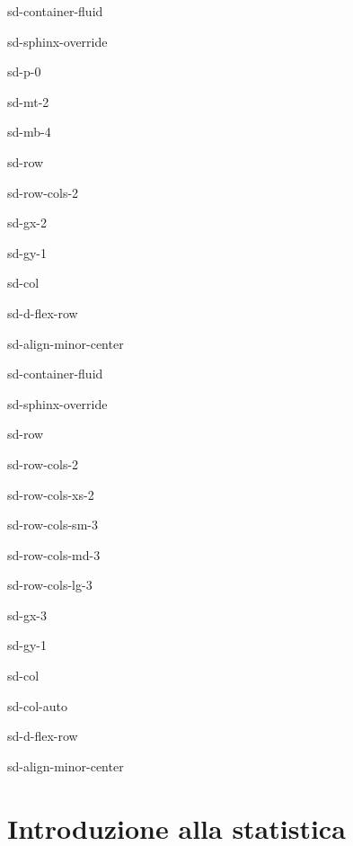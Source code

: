 \documentclass[letterpaper,10pt,italian]{jupyterBook}
\begin{document}
\begin{sphinxuseclass}{sd-container-fluid}
\begin{sphinxuseclass}{sd-sphinx-override}
\begin{sphinxuseclass}{sd-p-0}
\begin{sphinxuseclass}{sd-mt-2}
\begin{sphinxuseclass}{sd-mb-4}
\begin{sphinxuseclass}{sd-row}
\begin{sphinxuseclass}{sd-row-cols-2}
\begin{sphinxuseclass}{sd-gx-2}
\begin{sphinxuseclass}{sd-gy-1}
\begin{sphinxuseclass}{sd-col}
\begin{sphinxuseclass}{sd-d-flex-row}
\begin{sphinxuseclass}{sd-align-minor-center}
\begin{sphinxuseclass}{sd-container-fluid}
\begin{sphinxuseclass}{sd-sphinx-override}
\begin{sphinxuseclass}{sd-row}
\begin{sphinxuseclass}{sd-row-cols-2}
\begin{sphinxuseclass}{sd-row-cols-xs-2}
\begin{sphinxuseclass}{sd-row-cols-sm-3}
\begin{sphinxuseclass}{sd-row-cols-md-3}
\begin{sphinxuseclass}{sd-row-cols-lg-3}
\begin{sphinxuseclass}{sd-gx-3}
\begin{sphinxuseclass}{sd-gy-1}
\begin{sphinxuseclass}{sd-col}
\begin{sphinxuseclass}{sd-col-auto}
\begin{sphinxuseclass}{sd-d-flex-row}
\begin{sphinxuseclass}{sd-align-minor-center}
\end{sphinxuseclass}
\end{sphinxuseclass}
\end{sphinxuseclass}
\end{sphinxuseclass}
\end{sphinxuseclass}
\end{sphinxuseclass}
\end{sphinxuseclass}
\end{sphinxuseclass}
\end{sphinxuseclass}
\end{sphinxuseclass}
\end{sphinxuseclass}
\end{sphinxuseclass}
\end{sphinxuseclass}
\end{sphinxuseclass}
\end{sphinxuseclass}
\end{sphinxuseclass}
\end{sphinxuseclass}
\end{sphinxuseclass}
\end{sphinxuseclass}
\end{sphinxuseclass}
\end{sphinxuseclass}
\end{sphinxuseclass}
\end{sphinxuseclass}
\end{sphinxuseclass}
\end{sphinxuseclass}
\end{sphinxuseclass}

\chapter{Introduzione alla statistica}
\label{\detokenize{ch/statistics:introduzione-alla-statistica}}\label{\detokenize{ch/statistics:math-hs-statistics}}\label{\detokenize{ch/statistics::doc}}
\end{document}
